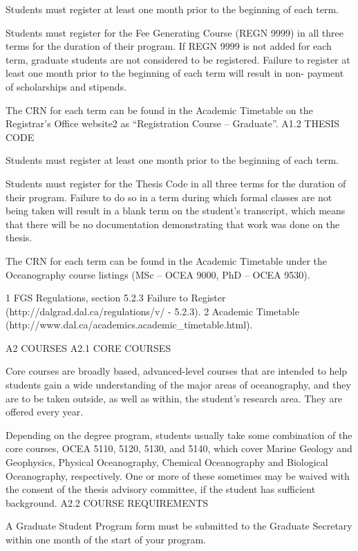 Students must register at least one month prior to the beginning of each term.

Students must register for the Fee Generating Course (REGN 9999) in all three terms for the duration of their program. If REGN 9999 is not added for each term, graduate students are not considered to be registered. Failure to register at least one month prior to the beginning of each term will result in non- payment of scholarships and stipends.

The CRN for each term can be found in the Academic Timetable on the Registrar’s Office website2 as “Registration Course – Graduate”.
A1.2	THESIS CODE

Students must register at least one month prior to the beginning of each term.

Students must register for the Thesis Code in all three terms for the duration of their program. Failure to do so in a term during which formal classes are not being taken will result in a blank term on the student’s transcript, which means that there will be no documentation demonstrating that work was done on the thesis.

The CRN for each term can be found in the Academic Timetable under the Oceanography course listings (MSc – OCEA 9000, PhD – OCEA 9530).




1 FGS Regulations, section 5.2.3 Failure to Register (http://dalgrad.dal.ca/regulations/v/ - 5.2.3).
2 Academic Timetable (http://www.dal.ca/academics.academic_timetable.html).
 

A2	COURSES
A2.1	CORE COURSES

Core courses are broadly based, advanced-level courses that are intended to help students gain a wide understanding of the major areas of oceanography, and they are to be taken outside, as well as within, the student’s research area. They are offered every year.

Depending on the degree program, students usually take some combination of the core courses, OCEA 5110, 5120, 5130, and 5140, which cover Marine Geology and Geophysics, Physical Oceanography, Chemical Oceanography and Biological Oceanography, respectively. One or more of these sometimes may be waived with the consent of the thesis advisory committee, if the student has sufficient background.
A2.2	COURSE REQUIREMENTS

A Graduate Student Program form must be submitted to the Graduate Secretary within one month of the start of your program.

